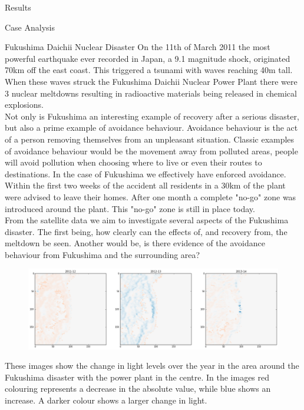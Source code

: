 \documentclass[12.5pt,fleqn,leqno,letterpaper]{article}
\begin{document}
\begin{section}{Results}
\begin{subsection}{Case Analysis}
    \begin{subsubsection}{Fukushima Daichii Nuclear Disaster}
      On the 11th of March 2011 the most powerful earthquake ever recorded in Japan, a 9.1 magnitude shock, originated 70km off the east coast. This triggered a tsunami with waves reaching 40m tall. When these waves struck the Fukushima Daichii Nuclear Power Plant there were 3 nuclear meltdowns resulting in radioactive materials being released in chemical explosions. \\
      Not only is Fukushima an interesting example of recovery after a serious disaster, but also a prime example of avoidance behaviour. Avoidance behaviour is the act of a person removing themselves from an unpleasant situation. Classic examples of avoidance behaviour would be the movement away from polluted areas, people will avoid pollution when choosing where to live or even their routes to destinations. In the case of Fukushima we effectively have enforced avoidance. Within the first two weeks of the accident all residents in a 30km of the plant were advised to leave their homes. After one month a complete "no-go" zone was introduced around the plant. This "no-go" zone is still in place today. \\
      From the satellite data we aim to investigate several aspects of the Fukushima disaster. The first being, how clearly can the effects of, and recovery from, the meltdown be seen. Another would be, is there evidence of the avoidance behaviour from Fukushima and the surrounding area? 
      \begin{figure}[H]
        \centering
        \includegraphics[width=1\linewidth]{fukushima}\label{fig:fukushima}
      \end{figure}
      These images show the change in light levels over the year in the area around the Fukushima disaster with the power plant in the centre. In the images red colouring represents a decrease in the absolute value, while blue shows an increase. A darker colour shows a larger change in light. \\

\end{subsubsection}
\end{subsection}
\end{section}
\end{document}
